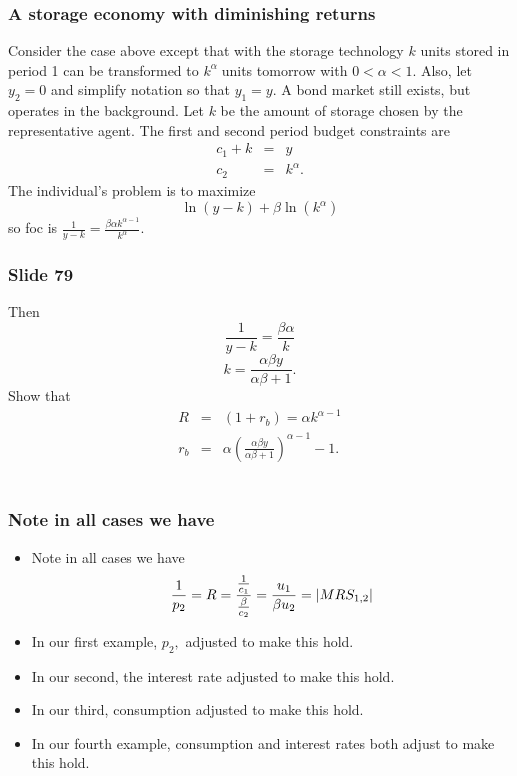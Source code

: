 \documentclass[aspectratio=169]{ltx-talk}
\begin{document}
\begin{frame}
\frametitle{A storage economy with diminishing returns}
Consider the case above except that with the storage technology $k$ units
stored in period 1 can be transformed to $k^{\alpha }\;$units tomorrow with $%
0<\alpha <1$. Also, let $y_{2}=0$ and simplify notation so that $y_{1}=y.$ A
bond market still exists, but operates in the background. Let $k$ be the
amount of storage chosen by the representative agent. The first and second
period budget constraints are 
\begin{eqnarray*}
c_{1}+k &=&y \\
c_{2} &=&k^{\alpha }.
\end{eqnarray*}%
The individual's problem is to maximize 
\begin{equation*}
\ln \left( y-k\right) +\beta \ln \left( k^{\alpha }\right)
\end{equation*}%
so foc is $\frac{1}{y-k}=\frac{\beta \alpha k^{\alpha -1}}{k^{\alpha }}.$%
\end{frame}

\begin{frame}
\frametitle{Slide 79}
Then 
\begin{equation*}
\frac{1}{y-k}=\frac{\beta \alpha }{k}
\end{equation*}%
\begin{equation*}
k=\frac{\alpha \beta y}{\alpha \beta +1}.
\end{equation*}%
Show that 
\begin{eqnarray*}
R &=&\left( 1+r_{b}\right) =\alpha k^{\alpha -1} \\
r_{b} &=&\alpha \left( \frac{\alpha \beta y}{\alpha \beta +1}\right)
^{\alpha -1}-1.
\end{eqnarray*}%
$\allowbreak $

\begin{itemize}
\end{itemize}
\end{frame}

\begin{frame}
\frametitle{Note in all cases we have}
\begin{itemize}
\item Note in all cases we have 
\begin{equation*}
\frac{1}{p_{2}}=R=\frac{\frac{1}{c_{1}}}{\frac{\beta }{c_{2}}}=\frac{u_{1}}{%
\beta u_{2}}=\left\vert MRS_{1,2}\right\vert
\end{equation*}

\item In our first example, $p_{2},$ adjusted to make this hold.

\item In our second, the interest rate adjusted to make this hold.

\item In our third, consumption adjusted to make this hold.

\item In our fourth example, consumption and interest rates both adjust to
make this hold.
\end{itemize}
\end{frame}
\end{document}
